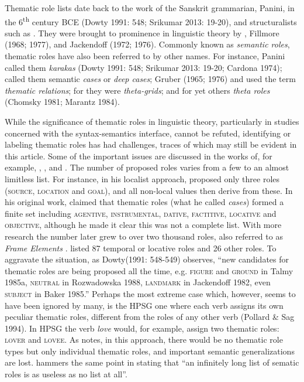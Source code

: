 \documentclass[output=paper]{langsci/langscibook}
\begin{document}
Thematic role lists date back to the work of the Sanskrit grammarian, Panini, in the 6\textsuperscript{th} century BCE (Dowty 1991: 548; Srikumar 2013: 19-20), and structuralists such as \citet{Blake1930}. They were brought to prominence in linguistic theory by \citet{Gruber1965}, Fillmore (1968; 1977), and Jackendoff (1972; 1976). Commonly known as \textit{semantic roles}, thematic roles have also been referred to by other names. For instance, Panini called them \textit{karakas }(Dowty 1991: 548; Srikumar 2013: 19-20; Cardona 1974); \citet{Fillmore1968} called them semantic \textit{cases} or \textit{deep cases}; Gruber (1965; 1976) and \citet{Jackendoff1972} used the term \textit{thematic relations}; for \citet{Stowell1981} they were \textit{theta-grids}; and for yet others \textit{theta roles} (Chomsky 1981; Marantz 1984). 

While the significance of thematic roles in linguistic theory, particularly in studies concerned with the syntax-semantics interface, cannot be refuted, identifying or labeling thematic roles has had challenges, traces of which may still be evident in this article. Some of the important issues are discussed in the works of, for example, \citet{Dowty1991}, \citet{Jackendoff1987}, \citet[689]{Newmeyer2010} and \citet[6]{KittilaEtAl2011}. The number of proposed roles varies from a few to an almost limitless list. For instance, in his localist approach, \citet{Anderson1971} proposed only three roles (\textsc{source, location} and \textsc{goal}), and all non-local values then derive from these. In his original work, \citet{Fillmore1968} claimed that thematic roles (what he called \textit{cases}) formed a finite set including \textsc{agentive, instrumental, dative, factitive, locative} and \textsc{objective,} although he made it clear this was not a complete list. With more research the number later grew to over two thousand roles, also referred to as \textit{Frame Elements} \citep{Fillmore1985}. \citet{Blake1930} listed 87 temporal or locative roles and 26 other roles. To aggravate the situation, as Dowty\textit {}(1991: 548-549) observes, “new candidates for thematic roles are being proposed all the time, e.g. \textsc{figure} and \textsc{ground} in Talmy 1985a, \textsc{neutral} in Rozwadowska 1988, \textsc{landmark} in Jackendoff 1982, even \textsc{subject} in Baker 1985.” Perhaps the most extreme case which, however, seems to have been ignored by many, is the HPSG one where each verb assigns its own peculiar thematic roles, different from the roles of any other verb (Pollard \& Sag 1994). In HPSG the verb \textit{love} would, for example, assign two thematic roles: \textsc{lover} and \textsc{lovee}. As \citet{Dowty1989} notes, in this approach, there would be no thematic role types but only individual thematic roles, and important semantic generalizations are lost. \citet[52]{Payne1997} hammers the same point in stating that “an infinitely long list of sematic roles is as useless as no list at all”.
\end{document}
